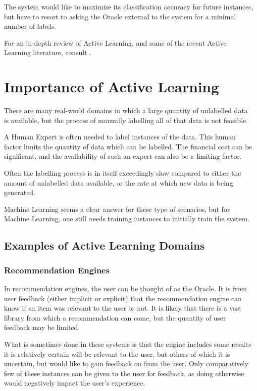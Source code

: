 \documentclass[a4paper,11pt]{report}
\begin{document}
The system would like to maximize its classification accuracy for future instances, but have to resort to asking the Oracle external to the system for a minimal number of labels.

For an in-depth review of Active Learning, and some of the recent Active Learning literature, consult \citep{Settles2010}.

\section{Importance of Active Learning}
There are many real-world domains in which a large quantity of unlabelled data is available, but the process of manually labelling all of that data is not feasible. 

A Human Expert is often needed to label instances of the data. This human factor limits the quantity of data which can be labelled. The financial cost can be significant, and the availability of such an expert can also be a limiting factor.

Often the labelling process is in itself exceedingly slow compared to either the amount of unlabelled data available, or the rate at which new data is being generated. 

Machine Learning seems a clear answer for these type of scenarios, but for Machine Learning, one still needs training instances to initially train the system.

\subsection{Examples of Active Learning Domains}
\subsubsection{Recommendation Engines}
In recommendation engines, the user can be thought of as the Oracle. It is from user feedback (either implicit or explicit) that the recommendation engine can know if an item was relevant to the user or not. It is likely that there is a vast library from which a recommendation can come, but the quantity of user feedback may be limited.

What is sometimes done in these systems is that the engine includes some results it is relatively certain will be relevant to the user, but others of which it is uncertain, but would like to gain feedback on from the user. Only comparatively few of these instances can be given to the user for feedback, as doing otherwise would negatively impact the user's experience.
\end{document}
